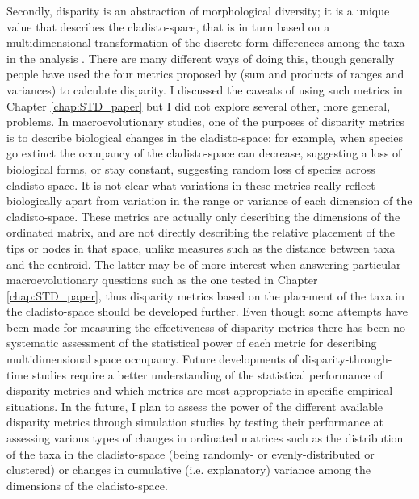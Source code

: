 Secondly, disparity is an abstraction of morphological diversity; it is a unique value that describes the cladisto-space, that is in turn based on a multidimensional transformation of the discrete form differences among the taxa in the analysis \citep{Wills1994,foote1997evolution}.
There are many different ways of doing this, though generally people have used the four metrics proposed by \cite{Wills1994} (sum and products of ranges and variances) to calculate disparity.
I discussed the caveats of using such metrics in Chapter \ref{chap:STD_paper} but I did not explore several other, more general, problems.
In macroevolutionary studies, one of the purposes of disparity metrics is to describe biological changes in the cladisto-space: for example, when species go extinct the occupancy of the cladisto-space can decrease, suggesting a loss of biological forms, or stay constant, suggesting random loss of species across cladisto-space.
It is not clear what variations in these metrics really reflect biologically apart from variation in the range or variance of each dimension of the cladisto-space.
These metrics are actually only describing the dimensions of the ordinated matrix, and are not directly describing the relative placement of the tips or nodes in that space, unlike measures such as the distance between taxa and the centroid. 
The latter may be of more interest when answering particular macroevolutionary questions such as the one tested in Chapter \ref{chap:STD_paper}, thus disparity metrics based on the placement of the taxa in the cladisto-space should be developed further.
Even though some attempts have been made for measuring the effectiveness of disparity metrics \citep{Ciampaglio2001} there has been no systematic assessment of the statistical power of each metric for describing multidimensional space occupancy.
Future developments of disparity-through-time studies require a better understanding of the statistical performance of disparity metrics and which metrics are most appropriate in specific empirical situations.
In the future, I plan to assess the power of the different available disparity metrics \citep[e.g.][]{Wills1994,Ciampaglio2004,Hughes20082013,huang2015origins} through simulation studies by testing their performance at assessing various types of changes in ordinated matrices such as the distribution of the taxa in the cladisto-space (being randomly- or evenly-distributed or clustered) or changes in cumulative (i.e. explanatory) variance among the dimensions of the cladisto-space.

